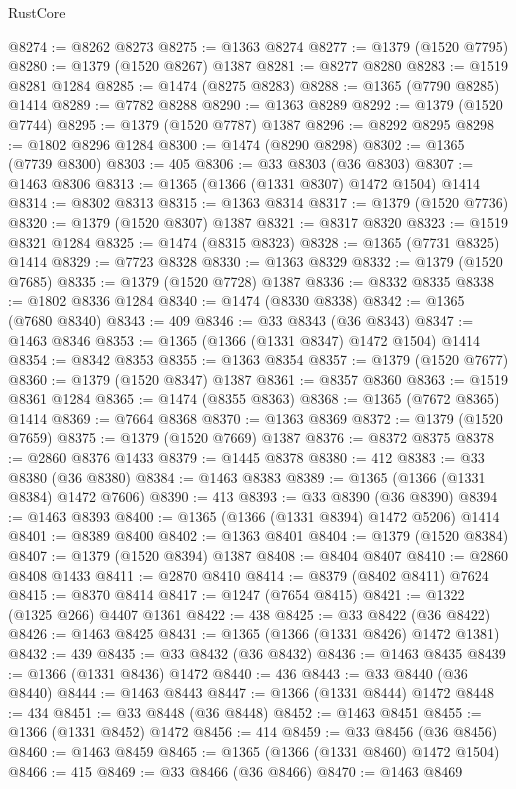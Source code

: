 \begin{lexlean}{RustCore}
\begin{coremodule}
@8274 := @8262 @8273
@8275 := @1363 @8274
@8277 := @1379 (@1520 @7795)
@8280 := @1379 (@1520 @8267) @1387
@8281 := @8277 @8280
@8283 := @1519 @8281 @1284
@8285 := @1474 (@8275 @8283)
@8288 := @1365 (@7790 @8285) @1414
@8289 := @7782 @8288
@8290 := @1363 @8289
@8292 := @1379 (@1520 @7744)
@8295 := @1379 (@1520 @7787) @1387
@8296 := @8292 @8295
@8298 := @1802 @8296 @1284
@8300 := @1474 (@8290 @8298)
@8302 := @1365 (@7739 @8300)
@8303 := 405
@8306 := @33 @8303 (@36 @8303)
@8307 := @1463 @8306
@8313 := @1365 (@1366 (@1331 @8307) @1472 @1504) @1414
@8314 := @8302 @8313
@8315 := @1363 @8314
@8317 := @1379 (@1520 @7736)
@8320 := @1379 (@1520 @8307) @1387
@8321 := @8317 @8320
@8323 := @1519 @8321 @1284
@8325 := @1474 (@8315 @8323)
@8328 := @1365 (@7731 @8325) @1414
@8329 := @7723 @8328
@8330 := @1363 @8329
@8332 := @1379 (@1520 @7685)
@8335 := @1379 (@1520 @7728) @1387
@8336 := @8332 @8335
@8338 := @1802 @8336 @1284
@8340 := @1474 (@8330 @8338)
@8342 := @1365 (@7680 @8340)
@8343 := 409
@8346 := @33 @8343 (@36 @8343)
@8347 := @1463 @8346
@8353 := @1365 (@1366 (@1331 @8347) @1472 @1504) @1414
@8354 := @8342 @8353
@8355 := @1363 @8354
@8357 := @1379 (@1520 @7677)
@8360 := @1379 (@1520 @8347) @1387
@8361 := @8357 @8360
@8363 := @1519 @8361 @1284
@8365 := @1474 (@8355 @8363)
@8368 := @1365 (@7672 @8365) @1414
@8369 := @7664 @8368
@8370 := @1363 @8369
@8372 := @1379 (@1520 @7659)
@8375 := @1379 (@1520 @7669) @1387
@8376 := @8372 @8375
@8378 := @2860 @8376 @1433
@8379 := @1445 @8378
@8380 := 412
@8383 := @33 @8380 (@36 @8380)
@8384 := @1463 @8383
@8389 := @1365 (@1366 (@1331 @8384) @1472 @7606)
@8390 := 413
@8393 := @33 @8390 (@36 @8390)
@8394 := @1463 @8393
@8400 := @1365 (@1366 (@1331 @8394) @1472 @5206) @1414
@8401 := @8389 @8400
@8402 := @1363 @8401
@8404 := @1379 (@1520 @8384)
@8407 := @1379 (@1520 @8394) @1387
@8408 := @8404 @8407
@8410 := @2860 @8408 @1433
@8411 := @2870 @8410
@8414 := @8379 (@8402 @8411) @7624
@8415 := @8370 @8414
@8417 := @1247 (@7654 @8415)
@8421 := @1322 (@1325 @266) @4407 @1361
@8422 := 438
@8425 := @33 @8422 (@36 @8422)
@8426 := @1463 @8425
@8431 := @1365 (@1366 (@1331 @8426) @1472 @1381)
@8432 := 439
@8435 := @33 @8432 (@36 @8432)
@8436 := @1463 @8435
@8439 := @1366 (@1331 @8436) @1472
@8440 := 436
@8443 := @33 @8440 (@36 @8440)
@8444 := @1463 @8443
@8447 := @1366 (@1331 @8444) @1472
@8448 := 434
@8451 := @33 @8448 (@36 @8448)
@8452 := @1463 @8451
@8455 := @1366 (@1331 @8452) @1472
@8456 := 414
@8459 := @33 @8456 (@36 @8456)
@8460 := @1463 @8459
@8465 := @1365 (@1366 (@1331 @8460) @1472 @1504)
@8466 := 415
@8469 := @33 @8466 (@36 @8466)
@8470 := @1463 @8469

\end{coremodule}
\end{lexlean}
